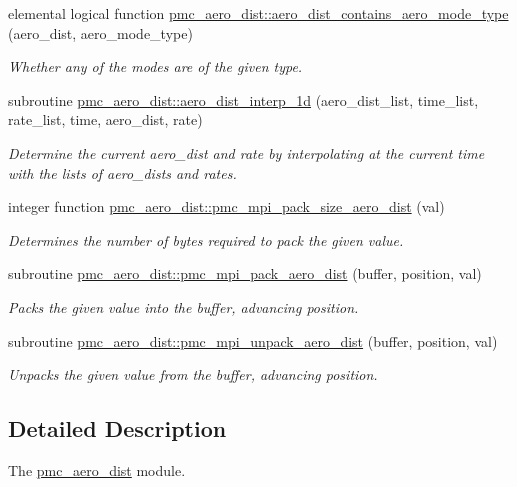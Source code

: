 \begin{DoxyCompactItemize}
elemental logical function \mbox{\hyperlink{namespacepmc__aero__dist_acb52a306c5fd713a1a76f66ef21b22d9}{pmc\+\_\+aero\+\_\+dist\+::aero\+\_\+dist\+\_\+contains\+\_\+aero\+\_\+mode\+\_\+type}} (aero\+\_\+dist, aero\+\_\+mode\+\_\+type)
\begin{DoxyCompactList}\small\item\em Whether any of the modes are of the given type. \end{DoxyCompactList}\item 
subroutine \mbox{\hyperlink{namespacepmc__aero__dist_a1fe0b780b71145acb4892b597f9218a5}{pmc\+\_\+aero\+\_\+dist\+::aero\+\_\+dist\+\_\+interp\+\_\+1d}} (aero\+\_\+dist\+\_\+list, time\+\_\+list, rate\+\_\+list, time, aero\+\_\+dist, rate)
\begin{DoxyCompactList}\small\item\em Determine the current aero\+\_\+dist and rate by interpolating at the current time with the lists of aero\+\_\+dists and rates. \end{DoxyCompactList}\item 
integer function \mbox{\hyperlink{namespacepmc__aero__dist_ac204813ce47a796777984e68f0e50dc7}{pmc\+\_\+aero\+\_\+dist\+::pmc\+\_\+mpi\+\_\+pack\+\_\+size\+\_\+aero\+\_\+dist}} (val)
\begin{DoxyCompactList}\small\item\em Determines the number of bytes required to pack the given value. \end{DoxyCompactList}\item 
subroutine \mbox{\hyperlink{namespacepmc__aero__dist_a33ef1e6098d7956dbdac21b37adfb337}{pmc\+\_\+aero\+\_\+dist\+::pmc\+\_\+mpi\+\_\+pack\+\_\+aero\+\_\+dist}} (buffer, position, val)
\begin{DoxyCompactList}\small\item\em Packs the given value into the buffer, advancing position. \end{DoxyCompactList}\item 
subroutine \mbox{\hyperlink{namespacepmc__aero__dist_a2a10f585be3b1cb326f523a68219dfa4}{pmc\+\_\+aero\+\_\+dist\+::pmc\+\_\+mpi\+\_\+unpack\+\_\+aero\+\_\+dist}} (buffer, position, val)
\begin{DoxyCompactList}\small\item\em Unpacks the given value from the buffer, advancing position. \end{DoxyCompactList}\end{DoxyCompactItemize}


\subsection{Detailed Description}
The \mbox{\hyperlink{namespacepmc__aero__dist}{pmc\+\_\+aero\+\_\+dist}} module. 

